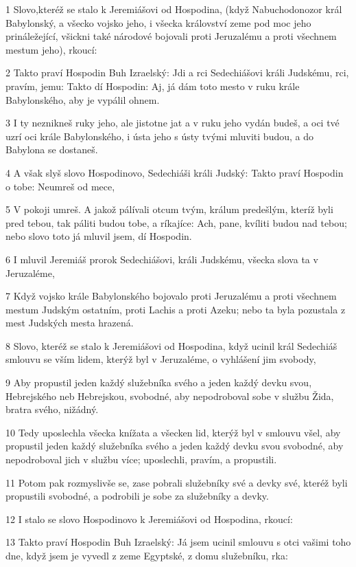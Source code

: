 \par 1 Slovo,kteréž se stalo k Jeremiášovi od Hospodina, (když Nabuchodonozor král Babylonský, a všecko vojsko jeho, i všecka království zeme pod moc jeho prináležející, všickni také národové bojovali proti Jeruzalému a proti všechnem mestum jeho), rkoucí:
\par 2 Takto praví Hospodin Buh Izraelský: Jdi a rci Sedechiášovi králi Judskému, rci, pravím, jemu: Takto dí Hospodin: Aj, já dám toto mesto v ruku krále Babylonského, aby je vypálil ohnem.
\par 3 I ty neznikneš ruky jeho, ale jistotne jat a v ruku jeho vydán budeš, a oci tvé uzrí oci krále Babylonského, i ústa jeho s ústy tvými mluviti budou, a do Babylona se dostaneš.
\par 4 A však slyš slovo Hospodinovo, Sedechiáši králi Judský: Takto praví Hospodin o tobe: Neumreš od mece,
\par 5 V pokoji umreš. A jakož pálívali otcum tvým, králum predešlým, kteríž byli pred tebou, tak páliti budou tobe, a ríkajíce: Ach, pane, kvíliti budou nad tebou; nebo slovo toto já mluvil jsem, dí Hospodin.
\par 6 I mluvil Jeremiáš prorok Sedechiášovi, králi Judskému, všecka slova ta v Jeruzaléme,
\par 7 Když vojsko krále Babylonského bojovalo proti Jeruzalému a proti všechnem mestum Judským ostatním, proti Lachis a proti Azeku; nebo ta byla pozustala z mest Judských mesta hrazená.
\par 8 Slovo, kteréž se stalo k Jeremiášovi od Hospodina, když ucinil král Sedechiáš smlouvu se vším lidem, kterýž byl v Jeruzaléme, o vyhlášení jim svobody,
\par 9 Aby propustil jeden každý služebníka svého a jeden každý devku svou, Hebrejského neb Hebrejskou, svobodné, aby nepodroboval sobe v službu Žida, bratra svého, nižádný.
\par 10 Tedy uposlechla všecka knížata a všecken lid, kterýž byl v smlouvu všel, aby propustil jeden každý služebníka svého a jeden každý devku svou svobodné, aby nepodroboval jich v službu více; uposlechli, pravím, a propustili.
\par 11 Potom pak rozmyslivše se, zase pobrali služebníky své a devky své, kteréž byli propustili svobodné, a podrobili je sobe za služebníky a devky.
\par 12 I stalo se slovo Hospodinovo k Jeremiášovi od Hospodina, rkoucí:
\par 13 Takto praví Hospodin Buh Izraelský: Já jsem ucinil smlouvu s otci vašimi toho dne, když jsem je vyvedl z zeme Egyptské, z domu služebníku, rka:

